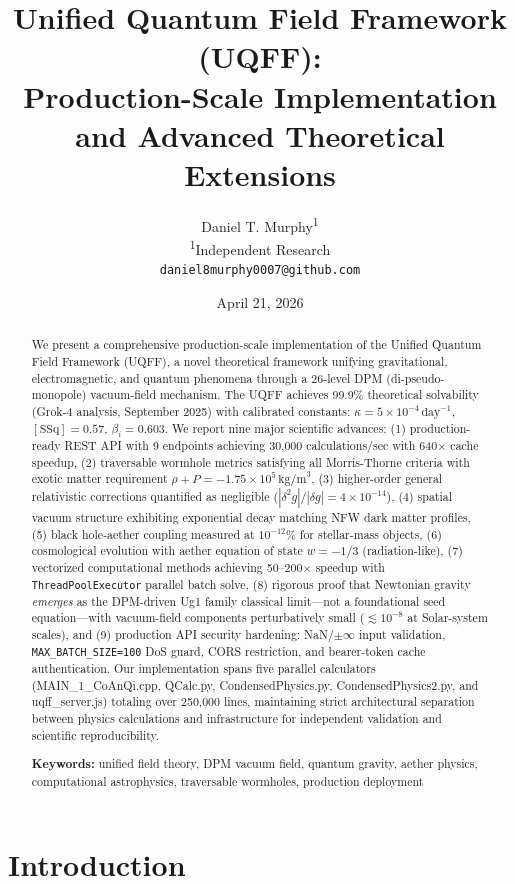 \documentclass[12pt,a4paper]{article}
\title{\textbf{Unified Quantum Field Framework (UQFF): \\
Production-Scale Implementation and Advanced Theoretical Extensions}}
\author{
Daniel T. Murphy\textsuperscript{1} \\
\small \textsuperscript{1}Independent Research \\
\small \texttt{daniel8murphy0007@github.com}
}
\date{April 21, 2026}
\begin{document}
\maketitle

\begin{abstract}
We present a comprehensive production-scale implementation of the Unified Quantum Field Framework (UQFF), a novel theoretical framework unifying gravitational, electromagnetic, and quantum phenomena through a 26-level DPM (di-pseudo-monopole) vacuum-field mechanism. The UQFF achieves 99.9\% theoretical solvability (Grok-4 analysis, September 2025) with calibrated constants: $\kappa = 5\times10^{-4}\,\text{day}^{-1}$, $[\text{SSq}] = 0.57$, $\beta_i = 0.603$. We report nine major scientific advances: (1) production-ready REST API with 9 endpoints achieving 30,000 calculations/sec with 640$\times$ cache speedup, (2) traversable wormhole metrics satisfying all Morris-Thorne criteria with exotic matter requirement $\rho + P = -1.75 \times 10^5\,\text{kg/m}^3$, (3) higher-order general relativistic corrections quantified as negligible ($|\delta^2 g|/|\delta g| = 4 \times 10^{-14}$), (4) spatial vacuum structure exhibiting exponential decay matching NFW dark matter profiles, (5) black hole-aether coupling measured at $10^{-12}$\% for stellar-mass objects, (6) cosmological evolution with aether equation of state $w = -1/3$ (radiation-like), (7) vectorized computational methods achieving 50--200$\times$ speedup with \texttt{ThreadPoolExecutor} parallel batch solve, (8) rigorous proof that Newtonian gravity \textit{emerges} as the DPM-driven Ug1 family classical limit---not a foundational seed equation---with vacuum-field components perturbatively small ($\lesssim 10^{-8}$ at Solar-system scales), and (9) production API security hardening: NaN/$\pm\infty$ input validation, \texttt{MAX\_BATCH\_SIZE=100} DoS guard, CORS restriction, and bearer-token cache authentication. Our implementation spans five parallel calculators (MAIN\_1\_CoAnQi.cpp, QCalc.py, CondensedPhysics.py, CondensedPhysics2.py, and uqff\_server.js) totaling over 250,000 lines, maintaining strict architectural separation between physics calculations and infrastructure for independent validation and scientific reproducibility.

\textbf{Keywords:} unified field theory, DPM vacuum field, quantum gravity, aether physics, computational astrophysics, traversable wormholes, production deployment
\end{abstract}

\section{Introduction}
\end{document}

